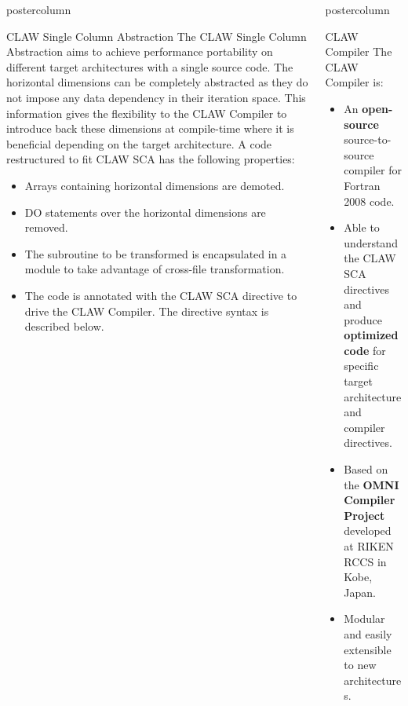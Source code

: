 \documentclass{beamer}
\newlength{\columnheight}
\begin{document}
\begin{frame}
\begin{columns}
\begin{column}{.43\textwidth}
\begin{beamercolorbox}[center]{postercolumn}
\begin{minipage}{.98\textwidth}
{\begin{myblock}{CLAW Single Column Abstraction}
The CLAW Single Column Abstraction aims to achieve performance portability
on different target architectures with a single source code.
The horizontal dimensions can be completely abstracted as they do not impose
any data dependency in their iteration space.
This information gives the flexibility to the CLAW Compiler to introduce
back these dimensions at compile-time where it is beneficial depending on the
target architecture.
A code restructured to fit CLAW SCA has the following properties:
\begin{itemize}
  \item Arrays containing horizontal dimensions are demoted.
  \item DO statements over the horizontal dimensions are removed.
  \item The subroutine to be transformed is encapsulated in a module to take
        advantage of cross-file transformation.
  \item The code is annotated with the CLAW SCA directive to drive the CLAW
        Compiler. The directive syntax is described below.
\end{itemize}

\clawa

\end{myblock}\vfill

}\end{minipage}\end{beamercolorbox}
\end{column}

%
%
\begin{column}{.57\textwidth}
\begin{beamercolorbox}[center]{postercolumn}
\begin{minipage}{.98\textwidth} %
\parbox[t][\columnheight]{\textwidth}{ %

%
%
\begin{myblock}{CLAW Compiler}
The CLAW Compiler is:
\begin{itemize}
  \item An \textbf{open-source} source-to-source compiler for Fortran 2008 code.
  \item Able to understand the CLAW SCA directives and produce \textbf{optimized
        code} for specific target architecture and compiler directives.
  \item Based on the \textbf{OMNI Compiler Project}\cite{Omni} developed at
        RIKEN RCCS in Kobe, Japan.
  \item Modular and easily extensible to new architectures.
\end{itemize}


\end{myblock}}
\end{minipage}
\end{beamercolorbox}
\end{column}
\end{columns}
\end{frame}
\end{document}
